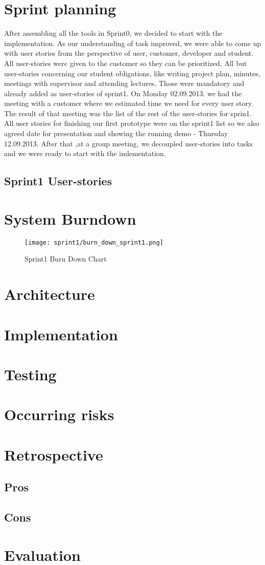\section{Sprint planning}
After assembling all the tools in Sprint0, we decided to start with the implementation.
As our understanding of task improved, we were able to come up with user stories from the perspective of user, customer, developer and student.
All user-stories were given to the customer so they can be prioritized. 
All but user-stories concerning our student obligations, like writing project plan, minutes, meetings with supervisor and attending lectures.
Those were mandatory and already added as user-stories of sprint1.
On Monday 02.09.2013. we had the meeting with a customer where we estimated time we need for every user story.
The result of that meeting was the list of the rest of the user-stories for sprin1.
All user stories for finishing our first prototype were on the sprint1 list so we also agreed date for presentation and showing the running demo - Thursday 12.09.2013. 
After that ,at a group meeting, we decoupled user-stories into tasks and we were ready to start with the imlementation.

\subsection{Sprint1 User-stories}

\section{System Burndown}

\begin{figure}[H]
	\centering
		\texttt{[image: sprint1/burn\_down\_sprint1.png]}
	\caption{Sprint1 Burn Down Chart}
	\label{fig:sprint1_burn_down_chart}
\end{figure}

\section{Architecture}
\section{Implementation}
\section{Testing}
\section{Occurring risks}
\section{Retrospective}
\subsection{Pros}
\subsection{Cons}
\section{Evaluation}